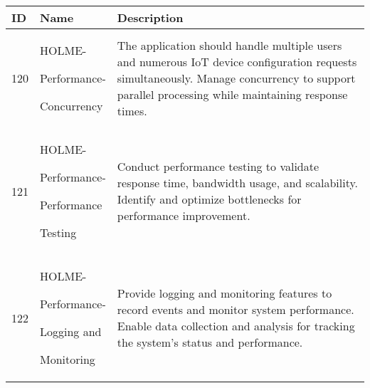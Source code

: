 \documentclass[conference]{IEEEtran}
\begin{document}
\begin{enumerate}
\begin{table}[h]
\def\arraystretch{1.2} \small
    \begin{tabular}{|p{1cm}|p{1.8cm}|p{5.0cm}|}
        \hline
        ID & Name & Description\\ \hline
        120 \par  & HOLME-\par Performance-\par Concurrency &The application should handle multiple users and numerous IoT device configuration requests simultaneously. Manage concurrency to support parallel processing while maintaining response times.  \\ \hline
        121\par  & HOLME-\par Performance-\par Performance \par Testing & Conduct performance testing to validate response time, bandwidth usage, and scalability. Identify and optimize bottlenecks for performance improvement. \\ \hline
        122 \par  & HOLME-\par Performance-\par Logging and \par   Monitoring & Provide logging and monitoring features to record events and monitor system performance. Enable data collection and analysis for tracking the system's status and performance. \\ \hline
    \end{tabular}
\end{table}
\vspace{1cm}


\end{enumerate}
\end{document}
